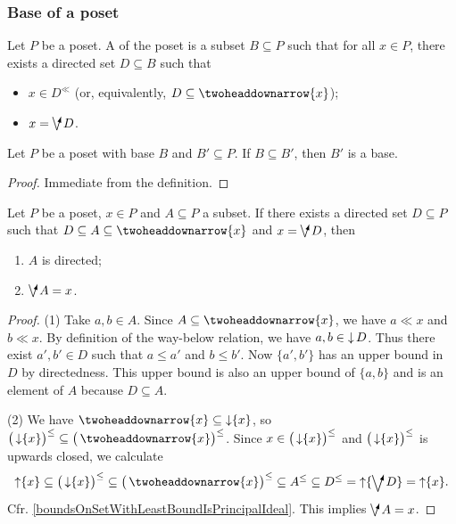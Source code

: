 \subsubsection{Base of a poset}
\begin{definition}
Let $P$ be a poset. A  of the poset is a subset $B\subseteq P$ such that for all $x\in P$, there exists a directed set $D\subseteq B$ such that
\begin{itemize}
\item $x\in D^\ll$ (or, equivalently, $D\subseteq \ddownset\{x\}$);
\item $x = \dirvee D$.
\end{itemize}
\end{definition}

\begin{lemma} \label{posetBaseInclusionLemma}
Let $P$ be a poset with base $B$ and $B'\subseteq P$. If $B\subseteq B'$, then $B'$ is a base.
\end{lemma}
\begin{proof}
Immediate from the definition.
\end{proof}

\begin{lemma} \label{approximatingSetDirected}
Let $P$ be a poset, $x\in P$ and $A\subseteq P$ a subset. If there exists a directed set $D\subseteq P$ such that $D\subseteq A \subseteq \ddownset\{x\}$ and $x = \dirvee D$, then
\begin{enumerate}
\item $A$ is directed;
\item $\dirvee A = x$.
\end{enumerate}
\end{lemma}
\begin{proof}
(1) Take $a, b\in A$. Since $A\subseteq \ddownset\{x\}$, we have $a \ll x$ and $b\ll x$. By definition of the way-below relation, we have $a,b\in \operatorname{\downarrow} D$. Thus there exist $a',b'\in D$ such that $a\leq a'$ and $b\leq b'$. Now $\{a',b'\}$ has an upper bound in $D$ by directedness. This upper bound is also an upper bound of $\{a,b\}$ and is an element of $A$ because $D\subseteq A$.

(2) We have $\ddownset\{x\}\subseteq \downset \{x\}$, so $\big(\downset \{x\}\big)^\leq \subseteq \big(\ddownset\{x\}\big)^\leq$. Since $x\in \big(\operatorname{\downarrow} \{x\}\big)^\leq$ and $\big(\operatorname{\downarrow} \{x\}\big)^\leq$ is upwards closed, we calculate
\[ \upset \{x\} \subseteq \big(\downset \{x\}\big)^\leq \subseteq \big(\ddownset\{x\}\big)^\leq \subseteq A^\leq \subseteq D^\leq = \upset \{\dirvee D\} = \upset \{x\}. \] 
Cfr. \ref{boundsOnSetWithLeastBoundIsPrincipalIdeal}. This implies $\dirvee A = x$.
\end{proof}

